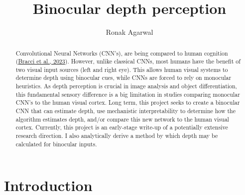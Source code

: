 \documentclass{article}
\title{Binocular depth perception}
\author{Ronak Agarwal}
\begin{document}
\maketitle

\begin{abstract}
\noindent Convolutional Neural Networks (CNN's), are being compared to human cognition (\href{https://doi.org/10.1371/journal.pcbi.1011086}{Bracci et al., 2023}). However, unlike classical CNNs, most humans have the benefit of two visual input sources (left and right eye). This allows human visual systems to determine depth using binocular cues, while CNNs are forced to rely on monocular heuristics. As depth perception is crucial in image analysis and object differentiation, this fundamental sensory difference is a big limitation in studies comparing monocular CNN's to the human visual cortex. \newline \newline
Long term, this project seeks to create a binocular CNN that can estimate depth, use mechanistic interpretability to determine how the algorithm estimates depth, and/or compare this new network to the human visual cortex. Currently, this project is an early-stage write-up of a potentially extensive research direction. I also analytically derive a method by which depth may be calculated for binocular inputs. 

\end{abstract}

\section{Introduction}
\end{document}
